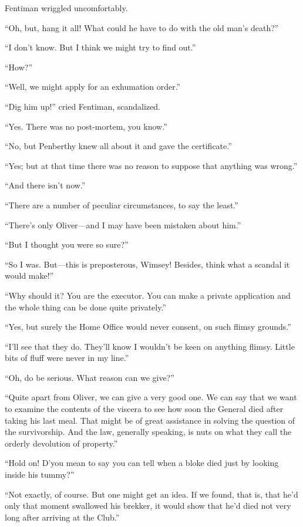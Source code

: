 Fentiman wriggled uncomfortably.

\enquote{Oh, but, hang it all! What could he have to do with the old man's death?}

\enquote{I don't know. But I think we might try to find out.}

\enquote{How?}

\enquote{Well, we might apply for an exhumation order.}

\enquote{Dig him up!} cried Fentiman, scandalized.

\enquote{Yes. There was no post-mortem, you know.}

\enquote{No, but Penberthy knew all about it and gave the certificate.}

\enquote{Yes; but at that time there was no reason to suppose that anything was wrong.}

\enquote{And there isn't now.}

\enquote{There are a number of peculiar circumstances, to say the least.}

\enquote{There's only Oliver\allowbreak---\allowbreak and I may have been mistaken about him.}

\enquote{But I thought you were so sure?}

\enquote{So I was. But\allowbreak---\allowbreak this is preposterous, Wimsey! Besides, think what a scandal it would make!}

\enquote{Why should it? You are the executor. You can make a private application and the whole thing can be done quite privately.}

\enquote{Yes, but surely the Home Office would never consent, on such flimsy grounds.}

\enquote{I'll see that they do. They'll know I wouldn't be keen on anything flimsy. Little bits of fluff were never in my line.}

\enquote{Oh, do be serious. What reason can we give?}

\enquote{Quite apart from Oliver, we can give a very good one. We can say that we want to examine the contents of the viscera to see how soon the General died after taking his last meal. That might be of great assistance in solving the question of the survivorship. And the law, generally speaking, is nuts on what they call the orderly devolution of property.}

\enquote{Hold on! D'you mean to say you can tell when a bloke died just by looking inside his tummy?}

\enquote{Not exactly, of course. But one might get an idea. If we found, that is, that he'd only that moment swallowed his brekker, it would show that he'd died not very long after arriving at the Club.}

